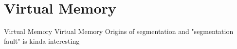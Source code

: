 \section[Virtual Memory]{Virtual Memory}
\begin{frame}{Virtual Memory}
  Virtual Memory 
  Origins of segmentation and "segmentation fault" is kinda interesting
\end{frame}
